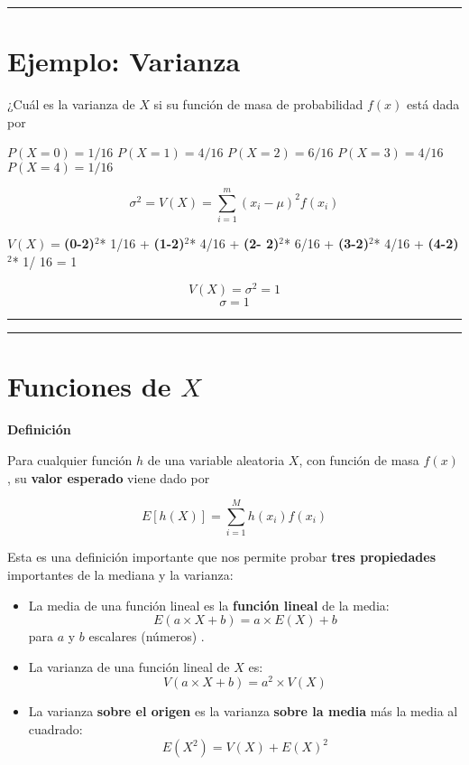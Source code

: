\documentclass[
]{book}
\begin{document}
\begin{center}\rule{0.5\linewidth}{0.5pt}\end{center}

\hypertarget{ejemplo-varianza}{%
\section{Ejemplo: Varianza}\label{ejemplo-varianza}}

¿Cuál es la varianza de \(X\) si su función de masa de probabilidad \(f(x)\) está dada por

\(P(X=0)=1/16\)
\(P(X=1)=4/16\)
\(P(X=2)=6/16\)
\(P(X=3)=4/16\)
\(P(X=4)=1/16\)

\[\sigma^2 =V(X)=\sum_{i=1}^m (x_i-\mu)^2 f(x_i)\]

\(V(X)=\)\textbf{(0-2)}\(^2\)* 1/16 + \textbf{(1-2)}\(^2\)* 4/16 + \textbf{(2- 2)}\(^2\)* 6/16 + \textbf{(3-2)}\(^2\)* 4/16 + \textbf{(4-2)}\(^2\)* 1/ 16 = 1

\[V(X)=\sigma^2=1\]
\[\sigma=1\]

\begin{center}\rule{0.5\linewidth}{0.5pt}\end{center}

\begin{center}\rule{0.5\linewidth}{0.5pt}\end{center}

\hypertarget{funciones-de-x}{%
\section{\texorpdfstring{Funciones de \(X\)}{Funciones de X}}\label{funciones-de-x}}

\textbf{Definición}

Para cualquier función \(h\) de una variable aleatoria \(X\), con función de masa \(f(x)\), su \textbf{valor esperado} viene dado por

\[ E[h(X)]= \sum_{i=1}^M h(x_i) f(x_i) \]

Esta es una definición importante que nos permite probar \textbf{tres propiedades} importantes de la mediana y la varianza:

\begin{itemize}
\item
  La media de una función lineal es la \textbf{función lineal} de la media: \[E(a\times X +b)= a\times E(X) +b\] para \(a\) y \(b\) escalares (números) .
\item
  La varianza de una función lineal de \(X\) es:\[V(a\times X +b)= a^2\times V(X)\]
\item
  La varianza \textbf{sobre el origen} es la varianza \textbf{sobre la media} más la media al cuadrado: \[E(X^2)=V(X)+E(X)^2\]
\end{itemize}
\end{document}
